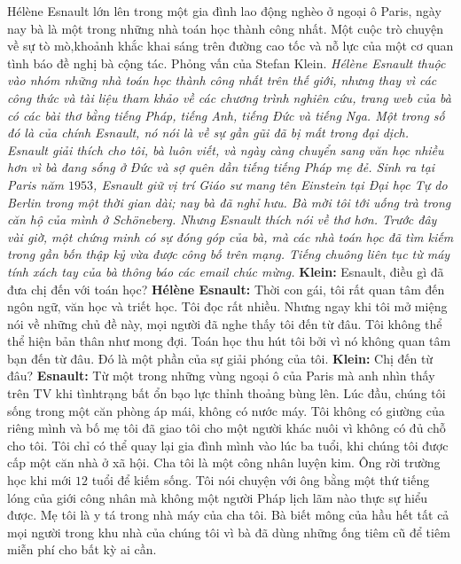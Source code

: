 \begin{multicols}{2}	
	Hélène Esnault lớn lên trong một gia đình lao động nghèo ở ngoại ô Paris, ngày nay bà là một trong những nhà toán học thành công nhất. Một cuộc trò chuyện về sự tò mò,\linebreak khoảnh khắc khai sáng trên đường cao tốc và nỗ lực của một cơ quan tình báo đề nghị bà cộng tác. Phỏng vấn của Stefan Klein.
	\vskip 0.1cm
	\textit{Hélène Esnault thuộc vào nhóm những nhà toán học thành công nhất trên thế giới, nhưng thay vì các công thức và tài liệu tham khảo về các chương trình nghiên cứu, trang web của bà có các bài thơ bằng tiếng Pháp, tiếng Anh, tiếng Đức và tiếng Nga. Một trong số đó là của \linebreak chính Esnault, nó nói là về sự gần gũi đã bị mất trong đại dịch. Esnault giải thích cho tôi, bà luôn viết, và ngày càng chuyển sang văn học nhiều hơn vì bà đang sống ở Đức và sợ quên dần tiếng tiếng Pháp mẹ đẻ.
		\vskip 0.1cm
		Sinh ra tại Paris năm $1953$, Esnault giữ vị trí Giáo sư mang tên Einstein tại Đại học Tự do Berlin trong một thời gian dài; nay bà đã nghỉ hưu. Bà mời tôi tới uống trà trong căn hộ của mình ở Schöneberg. Nhưng Esnault thích nói về thơ hơn. Trước đây vài giờ, một chứng minh có sự đóng góp của bà, mà các nhà toán học đã tìm kiếm trong gần bốn thập kỷ vừa được công bố trên mạng. Tiếng chuông liên tục từ máy tính xách tay của bà thông báo các email chúc mừng.}
	\vskip 0.1cm
	\textbf{\color{doithoaitoanhoc}Klein:} Esnault, điều gì đã đưa chị đến với toán học?
	\vskip 0.1cm
	\textbf{\color{doithoaitoanhoc}Hélène Esnault:} Thời con gái, tôi rất quan tâm đến ngôn ngữ, văn học và triết học. Tôi đọc rất nhiều. Nhưng ngay khi tôi mở miệng nói về những chủ đề này, mọi người đã nghe thấy tôi đến từ đâu. Tôi không thể thể hiện bản thân như mong đợi. Toán học thu hút tôi bởi vì nó không quan tâm bạn đến từ đâu. Đó là một phần của sự giải phóng của tôi.
	\vskip 0.1cm
	\textbf{\color{doithoaitoanhoc}Klein:} Chị đến từ đâu?
	\vskip 0.1cm
	\textbf{\color{doithoaitoanhoc}Esnault:} Từ một trong những vùng ngoại ô của Paris mà anh nhìn thấy trên TV khi tình\linebreak trạng bất ổn bạo lực thỉnh thoảng bùng lên. Lúc đầu, chúng tôi sống trong một căn phòng áp mái, không có nước máy. Tôi không có giường của riêng mình và bố mẹ tôi đã giao tôi cho một người khác nuôi vì không có đủ chỗ cho tôi. Tôi chỉ có thể quay lại gia đình mình vào lúc ba tuổi, khi chúng tôi được cấp một căn nhà ở xã hội. Cha tôi là một công nhân luyện kim. Ông rời trường học khi mới $12$ tuổi để kiếm sống. Tôi nói chuyện với ông bằng một thứ tiếng lóng của giới công nhân mà không một người Pháp lịch lãm nào thực sự hiểu được. Mẹ tôi là y tá trong nhà máy của cha tôi. Bà biết mông của hầu hết tất cả mọi người trong khu nhà của chúng tôi vì bà đã dùng những ống tiêm cũ để tiêm miễn phí cho bất kỳ ai cần.

\end{multicols}

